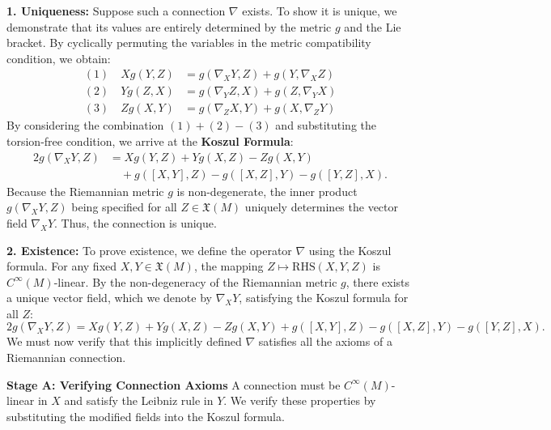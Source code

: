 \begin{solution}
\textbf{1. Uniqueness:}
Suppose such a connection $\nabla$ exists. To show it is unique, we demonstrate that its values are entirely determined by the metric $g$ and the Lie bracket. By cyclically permuting the variables in the metric compatibility condition, we obtain:
\begin{align*}
    (1) \quad Xg(Y, Z) &= g(\nabla_X Y, Z) + g(Y, \nabla_X Z) \\
    (2) \quad Yg(Z, X) &= g(\nabla_Y Z, X) + g(Z, \nabla_Y X) \\
    (3) \quad Zg(X, Y) &= g(\nabla_Z X, Y) + g(X, \nabla_Z Y)
\end{align*}
By considering the combination $(1) + (2) - (3)$ and substituting the torsion-free condition, we arrive at the \textbf{Koszul Formula}:
\[ \begin{aligned}
    2g(\nabla_X Y, Z) &= X g(Y, Z) + Y g(X, Z) - Z g(X, Y) \\
    &\quad + g([X, Y], Z) - g([X, Z], Y) - g([Y, Z], X).
\end{aligned} \]
Because the Riemannian metric $g$ is non-degenerate, the inner product $g(\nabla_X Y, Z)$ being specified for all $Z \in \mathfrak{X}(M)$ uniquely determines the vector field $\nabla_X Y$. Thus, the connection is unique.

\textbf{2. Existence:}
To prove existence, we define the operator $\nabla$ using the Koszul formula. For any fixed $X, Y \in \mathfrak{X}(M)$, the mapping $Z \mapsto \text{RHS}(X, Y, Z)$ is $C^\infty(M)$-linear. By the non-degeneracy of the Riemannian metric $g$, there exists a unique vector field, which we denote by $\nabla_X Y$, satisfying the Koszul formula for all $Z$:
\[ 2g(\nabla_X Y, Z) = X g(Y, Z) + Y g(X, Z) - Z g(X, Y) + g([X, Y], Z) - g([X, Z], Y) - g([Y, Z], X). \]
We must now verify that this implicitly defined $\nabla$ satisfies all the axioms of a Riemannian connection.

\textbf{Stage A: Verifying Connection Axioms}
A connection must be $C^\infty(M)$-linear in $X$ and satisfy the Leibniz rule in $Y$. We verify these properties by substituting the modified fields into the Koszul formula.


\end{solution}
